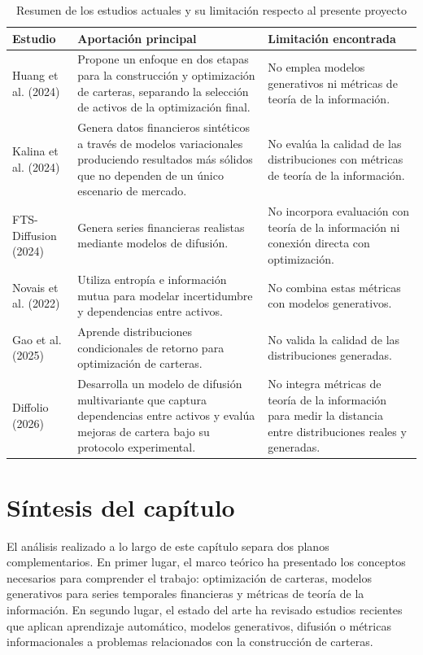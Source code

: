 \documentclass[11pt,a4paper,spanish,oneside]{book}
\numberwithin{equation}{chapter}
\numberwithin{figure}{chapter}
\begin{document}
{\small
\renewcommand{\arraystretch}{1.2}
\begin{table}[H]
\centering
\begin{tabular}{|p{2.5cm}|p{5.5cm}|p{5.5cm}|}
\hline
\textbf{Estudio} & \textbf{Aportación principal} & \textbf{Limitación encontrada} \\
\hline
Huang et al. (2024) &
Propone un enfoque en dos etapas para la construcción y optimización de carteras, separando la selección de activos de la optimización final. &
No emplea modelos generativos ni métricas de teoría de la información. \\
\hline
Kalina et al. (2024) &
Genera datos financieros sintéticos a través de modelos variacionales produciendo resultados más sólidos que no dependen de un único escenario de mercado. &
No evalúa la calidad de las distribuciones con métricas de teoría de la información. \\
\hline
FTS-Diffusion (2024) &
Genera series financieras realistas mediante modelos de difusión. &
No incorpora evaluación con teoría de la información ni conexión directa con optimización. \\
\hline
Novais et al. (2022) &
Utiliza entropía e información mutua para modelar incertidumbre y dependencias entre activos. &
No combina estas métricas con modelos generativos. \\
\hline
Gao et al. (2025) &
Aprende distribuciones condicionales de retorno para optimización de carteras. &
No valida la calidad de las distribuciones generadas. \\
\hline
Diffolio (2026) &
Desarrolla un modelo de difusión multivariante que captura dependencias entre activos y evalúa mejoras de cartera bajo su protocolo experimental. &
No integra métricas de teoría de la información para medir la distancia entre distribuciones reales y generadas. \\
\hline
\end{tabular}
\caption{Resumen de los estudios actuales y su limitación respecto al presente proyecto}\label{tab:estudios_actuales}
\end{table}
}

\section{Síntesis del capítulo}

El análisis realizado a lo largo de este capítulo separa dos planos complementarios. En primer lugar, el marco teórico ha presentado los conceptos necesarios para comprender el trabajo: optimización de carteras, modelos generativos para series temporales financieras y métricas de teoría de la información. En segundo lugar, el estado del arte ha revisado estudios recientes que aplican aprendizaje automático, modelos generativos, difusión o métricas informacionales a problemas relacionados con la construcción de carteras.
\end{document}
